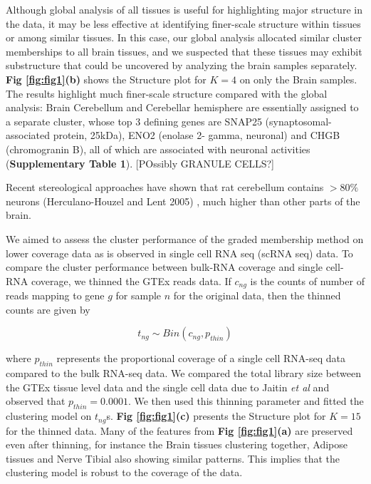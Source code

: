 
Although global analysis of all tissues is useful for highlighting major structure in the data, it may be less effective at identifying finer-scale structure within tissues or among similar tissues. In this case, our global analysis allocated similar cluster memberships to all brain tissues,  and we suspected that these tissues may exhibit substructure that could be uncovered by analyzing the brain samples separately.  \textbf{Fig \ref{fig:fig1}(b)} shows the Structure plot for $K=4$ on only the Brain samples. The results highlight much finer-scale structure compared with the global analysis: Brain Cerebellum and Cerebellar hemisphere are essentially assigned to a separate cluster,
whose top 3 defining genes are SNAP25 (synaptosomal-associated protein, 25kDa), ENO2 (enolase 2- gamma, neuronal) and CHGB (chromogranin B),  all of which are associated with neuronal activities (\textbf{Supplementary Table 1}). [POssibly GRANULE CELLS?]


Recent stereological approaches have shown that rat cerebellum contains $> 80 \%$ neurons (Herculano-Houzel and Lent 2005) \cite{Houzel2005}, much higher than other parts of the brain. 

We aimed to assess the cluster performance of the graded membership method on lower coverage data as is observed in single cell RNA seq (scRNA seq) data. To compare the cluster performance between bulk-RNA coverage and single cell-RNA coverage, we thinned the GTEx reads data. If $c_{ng}$ is the counts of number of reads mapping to gene $g$ for sample $n$ for the original data, then the thinned counts are given by 

$$ t_{ng} \sim Bin (c_{ng}, p_{thin})$$

where $p_{thin}$ represents the proportional coverage of a single cell RNA-seq data compared to the bulk RNA-seq data. We compared the total library size between the GTEx tissue level data and the single cell data due to Jaitin \textit{et al} \cite{Jaitin2014} and observed that $p_{thin} =0.0001$. We then used this thinning parameter and fitted the clustering model on $t_{ng}$s. \textbf{Fig \ref{fig:fig1}(c)} presents the Structure plot for $K=15$ for the thinned data. Many of the features from \textbf{Fig \ref{fig:fig1}(a)} are preserved even after thinning, for instance the Brain tissues clustering together, Adipose tissues and Nerve Tibial also showing similar patterns. This implies that the clustering model is robust to the coverage of the data. 

